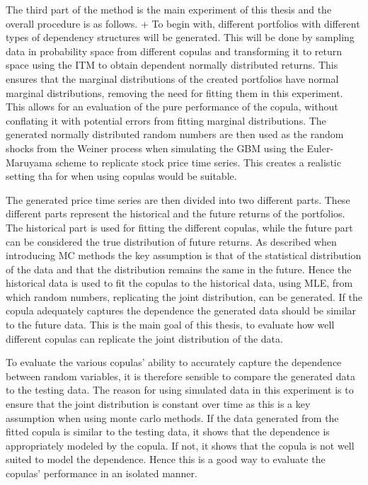 The third part of the method is the main experiment of this thesis and the overall procedure is as follows. + To begin with, different portfolios with different types of dependency structures will be generated. This will be done by sampling data in probability space from different copulas and transforming it to return space using the \gls{ITM} to obtain dependent normally distributed returns. This ensures that the marginal distributions of the created portfolios have normal marginal distributions, removing the need for fitting them in this experiment. This allows for an evaluation of the pure performance of the copula, without conflating it with potential errors from fitting marginal distributions. The generated normally distributed random numbers are then used as the random shocks from the Weiner process when simulating the \gls{GBM} using the Euler-Maruyama scheme to replicate stock price time series. This creates a realistic setting tha for when using copulas would be suitable.  

The generated price time series are then divided into two different parts. These different parts represent the historical and the future returns of the portfolios. The historical part is used for fitting the different copulas, while the future part can be considered the true distribution of future returns. As described when introducing \gls{MC} methods the key assumption is that of the statistical distribution of the data and that the distribution remains the same in the future. Hence the historical data is used to fit the copulas to the historical data, using \gls{MLE}, from which random numbers, replicating the joint distribution, can be generated. If the copula adequately captures the dependence the generated data should be similar to the future data. This is the main goal of this thesis, to evaluate how well different copulas can replicate the joint distribution of the data.

To evaluate the various copulas' ability to accurately capture the dependence between random variables, it is therefore sensible to compare the generated data to the testing data. The reason for using simulated data in this experiment is to ensure that the joint distribution is constant over time as this is a key assumption when using monte carlo methods. If the data generated from the fitted copula is similar to the testing data, it shows that the dependence is appropriately modeled by the copula. If not, it shows that the copula is not well suited to model the dependence. Hence this is a good way to evaluate the copulas' performance in an isolated manner. 

